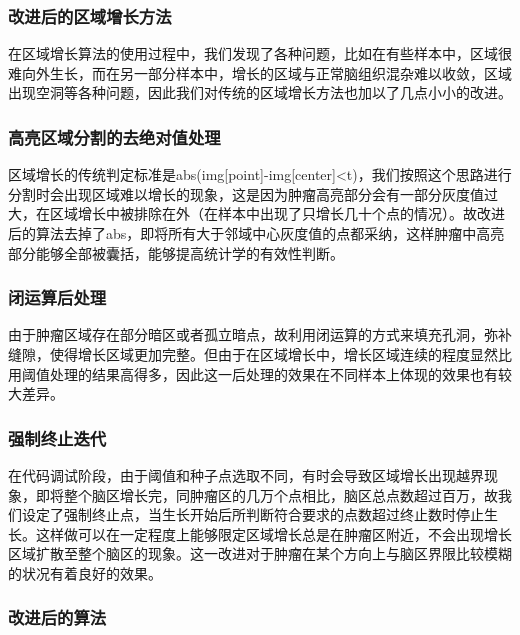\documentclass[UTF8]{ctexart}
\begin{document}
\subsubsection{改进后的区域增长方法}
在区域增长算法的使用过程中，我们发现了各种问题，比如在有些样本中，区域很难向外生长，而在另一部分样本中，增长的区域与正常脑组织混杂难以收敛，区域出现空洞等各种问题，因此我们对传统的区域增长方法也加以了几点小小的改进。

    \subsubsection*{高亮区域分割的去绝对值处理}

    区域增长的传统判定标准是abs(img[point]-img[center]<t)，我们按照这个思路进行分割时会出现区域难以增长的现象，这是因为肿瘤高亮部分会有一部分灰度值过大，在区域增长中被排除在外（在样本中出现了只增长几十个点的情况）。故改进后的算法去掉了abs，即将所有大于邻域中心灰度值的点都采纳，这样肿瘤中高亮部分能够全部被囊括，能够提高统计学的有效性判断。
    \subsubsection*{闭运算后处理}

    由于肿瘤区域存在部分暗区或者孤立暗点，故利用闭运算的方式来填充孔洞，弥补缝隙，使得增长区域更加完整。但由于在区域增长中，增长区域连续的程度显然比用阈值处理的结果高得多，因此这一后处理的效果在不同样本上体现的效果也有较大差异。

    \subsubsection*{强制终止迭代}

    在代码调试阶段，由于阈值和种子点选取不同，有时会导致区域增长出现越界现象，即将整个脑区增长完，同肿瘤区的几万个点相比，脑区总点数超过百万，故我们设定了强制终止点，当生长开始后所判断符合要求的点数超过终止数时停止生长。这样做可以在一定程度上能够限定区域增长总是在肿瘤区附近，不会出现增长区域扩散至整个脑区的现象。这一改进对于肿瘤在某个方向上与脑区界限比较模糊的状况有着良好的效果。

    \subsubsection*{改进后的算法}
    
\end{document}
